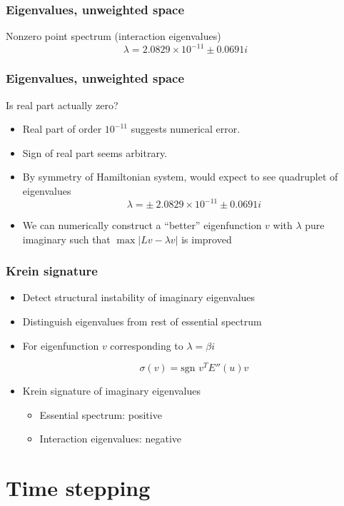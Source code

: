 \documentclass[16pt]{beamer}
\begin{document}
\begin{frame}
	\frametitle{Eigenvalues, unweighted space}
	\fontsize{16}{7.2}\selectfont
	\begin{block}{Nonzero point spectrum (interaction eigenvalues)}
		\[ \lambda = 2.0829 \times 10^{-11} \pm 0.0691i \]
	\end{block}
\end{frame}

\begin{frame}
	\frametitle{Eigenvalues, unweighted space}
	\fontsize{14}{7.2}\selectfont
	Is real part actually zero?
	\begin{itemize}
		\item<1->Real part of order $10^{-11}$ suggests numerical error.
		\item<2->Sign of real part seems arbitrary.
		\item<3->By symmetry of Hamiltonian system, would expect to see quadruplet of eigenvalues
		 \[ \lambda = \pm \: 2.0829 \times 10^{-11} \pm 0.0691i \]
		\item<4-> We can numerically construct a ``better'' eigenfunction $v$ with $\lambda$ pure imaginary such that $\max |Lv - \lambda v|$ is improved
	\end{itemize}
\end{frame}

\begin{frame}
	\frametitle{Krein signature}
	\fontsize{14}{7.2}\selectfont
	\begin{itemize}
		\item Detect structural instability of imaginary eigenvalues
		\item Distinguish eigenvalues from rest of essential spectrum
		\item For eigenfunction $v$ corresponding to $\lambda = \beta i$
		\begin{center}
			\[ \sigma(v) = \text{sgn }v^T E''(u) v \]
		\end{center}
		\item Krein signature of imaginary eigenvalues
		\begin{itemize}
			\item Essential spectrum: positive
			\item Interaction eigenvalues: negative
		\end{itemize}
	\end{itemize}
\end{frame}

\section{Time stepping}
\end{document}
